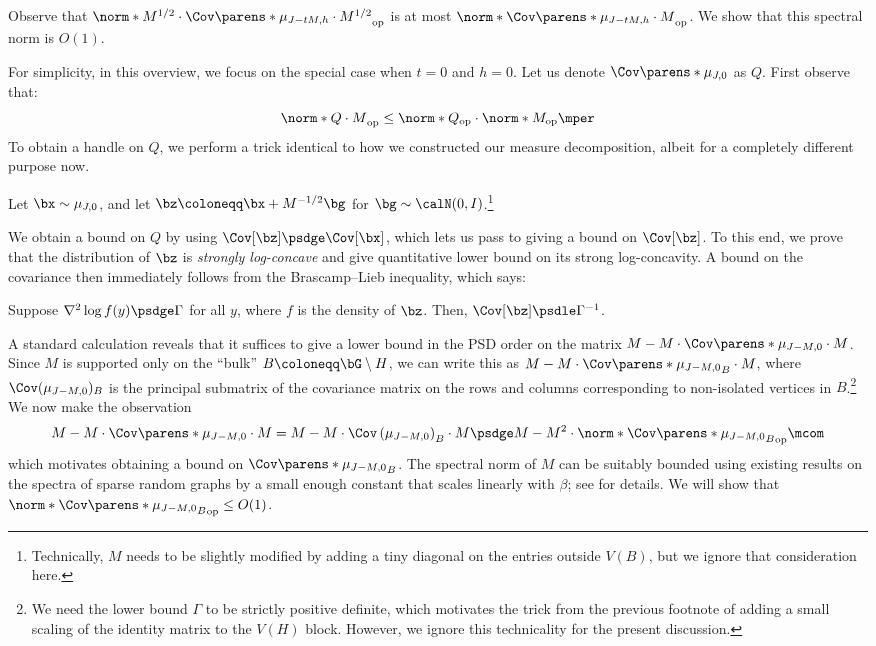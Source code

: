 \documentclass[11pt,letterpaper]{article}
\begin{document}
Observe that $\norm*{M^{1/2}\cdot\Cov\parens*{\mu_{J-tM, h}}\cdot M^{1/2}}_{\mathrm{op}}$ is at most $\norm*{\Cov\parens*{\mu_{J-tM, h}} \cdot M}_{\mathrm{op}}$.
We show that this spectral norm is $O(1)$.

For simplicity, in this overview, we focus on the special case when $t = 0$ and $h = 0$.
Let us denote $\Cov\parens*{\mu_{J,0}}$ as $Q$.
First observe that:
\[
    \norm*{Q \cdot M}_{\mathrm{op}} \le \norm*{Q}_{\mathrm{op}}\cdot\norm*{M}_{\mathrm{op}}\mper
\]
To obtain a handle on $Q$, we perform a trick identical to how we constructed our measure decomposition, albeit for a completely different purpose now.
\begin{displayquote}
    Let $\bx\sim\mu_{J,0}$, and let $\bz\coloneqq \bx + M^{-1/2}\bg$ for $\bg\sim\calN(0,I)$.\footnote{Technically, $M$ needs to be slightly modified by adding a tiny diagonal on the entries outside $V(B)$, but we ignore that consideration here.}
\end{displayquote}
We obtain a bound on $Q$ by using $\Cov[\bz] \psdge \Cov[\bx]$, which lets us pass to giving a bound on $\Cov[\bz]$.
To this end, we prove that the distribution of $\bz$ is \emph{strongly log-concave} and give quantitative lower bound on its strong log-concavity.
A bound on the covariance then immediately follows from the Brascamp--Lieb inequality, which says:
\begin{displayquote}
    Suppose $\nabla^2 \log f(y) \psdge \Gamma$ for all $y$, where $f$ is the density of $\bz$. Then, $\Cov[\bz]\psdle\Gamma^{-1}$.
\end{displayquote}
A standard calculation reveals that it suffices to give a lower bound in the PSD order on the matrix $M - M\cdot\Cov\parens*{\mu_{J-M,0}}\cdot M$.
Since $M$ is supported only on the ``bulk'' $B\coloneqq \bG\setminus H$, we can write this as $M - M\cdot\Cov\parens*{\mu_{J-M,0}}_{B}\cdot M$, where $\Cov(\mu_{J-M,0})_{B}$ is the principal submatrix of the covariance matrix on the rows and columns corresponding to non-isolated vertices in $B$.\footnote{We need the lower bound $\Gamma$ to be strictly positive definite, which motivates the trick from the previous footnote of adding a small scaling of the identity matrix to the $V(H)$ block.
However, we ignore this technicality for the present discussion.
}
We now make the observation
\[
    M - M\cdot\Cov\parens*{\mu_{J-M,0}}\cdot M = M - M \cdot \Cov\left( \mu_{J-M,0} \right)_B \cdot M \psdge M - M^2 \cdot \norm*{\Cov\parens*{\mu_{J-M,0}}_B}_{\mathrm{op}}\mcom
\]
which motivates obtaining a bound on $\Cov\parens*{\mu_{J-M,0}}_{B}$.
The spectral norm of $M$ can be suitably bounded using existing results on the spectra of sparse random graphs by a small enough constant that scales linearly with $\beta$; see  for details.
We will show that $\norm*{\Cov\parens*{\mu_{J-M,0}}_{B}}_{\mathrm{op}}\le O(1)$.
\end{document}
